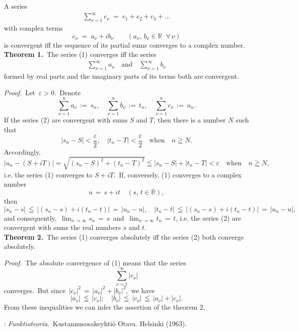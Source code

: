 \documentclass[12pt]{article}
\theoremstyle{definition}
\begin{document}
A series
\begin{align}
\sum_{\nu=1}^\infty c_\nu \;=\; c_1\!+\!c_2\!+\!c_3\!+\ldots
\end{align}
with complex terms
$$c_\nu \;=\; a_\nu\!+\!ib_\nu \qquad (a_\nu,\,b_\nu \in \mathbb{R}\;\; \forall\, \nu)$$
is convergent iff the sequence of its partial sums converges to a complex number.\\

\textbf{Theorem 1.}\, The series (1) converges iff the series
\begin{align}
\sum_{\nu=1}^\infty a_\nu \quad \mbox{and} \quad \sum_{\nu=1}^\infty b_\nu
\end{align}
formed by real parts and the imaginary parts of its terms both are convergent.

{\em Proof.}\, Let\, $\varepsilon > 0$.\, Denote\, 
$$\sum_{\nu=1}^n a_\nu \,:=\, s_n, \quad \sum_{\nu=1}^n b_\nu \,:=\, t_n, \quad \sum_{\nu=1}^n c_\nu \,:=\, u_n.$$
If the series (2) are convergent with sums $S$ and $T$, then there is a number $N$ such that
$$|s_n-S| < \frac{\varepsilon}{2}, \quad |t_n-T| < \frac{\varepsilon}{2} \quad \mbox{when} \quad n \geqq N.$$
Accordingly,
$$|u_n-(S\!+\!iT)| = \sqrt{(s_n-S)^2+(t_n-T)^2} \leqq |s_n-S|+|t_n-T| < \varepsilon \quad \mbox{when} \quad n \geqq N,$$
i.e. the series (1) converges to $S\!+\!iT$.\, If, conversely, (1) converges to a complex number\, 
$$u \,=\, s\!+\!it \quad (s,\,t \in\mathbb{R}),$$
then\, 
$$|s_n-s| \,\leqq\, |(s_n-s)+i(t_n-t)| \,=\, |u_n-u|, \quad |t_n-t| \,\leqq\, |(s_n-s)+i(t_n-t)| \,=\, |u_n-u|,$$
and consequently,\, $\displaystyle\lim_{n\to\infty}s_n \,=\, s$\, and\, $\displaystyle\lim_{n\to\infty}t_n \,=\, t$, i.e. the series (2) are convergent with sums the real numbers $s$ and $t$.\\

\textbf{Theorem 2.}\, The series (1) converges absolutely iff the series (2) both converge absolutely.

{\em Proof.}\, The absolute convergence of (1) means that the series
$$\sum_{\nu=1}^\infty |c_\nu|$$
converges.\, But since\, $|c_\nu|^2 \,=\, |a_\nu|^2+|b_\nu|^2$,\, we have
$$|a_\nu| \,\leqq\, |c_\nu|; \quad |b_\nu| \,\leqq\, |c_\nu| \,\leqq\, |a_\nu|+|c_\nu|.$$
From these inequalities we can infer the assertion of the theorem 2.

\begin{thebibliography}{9}
: {\em Funktioteoria}.\, Kustannusosakeyhti\"o Otava. Helsinki (1963).
\end{thebibliography}



\end{document}
